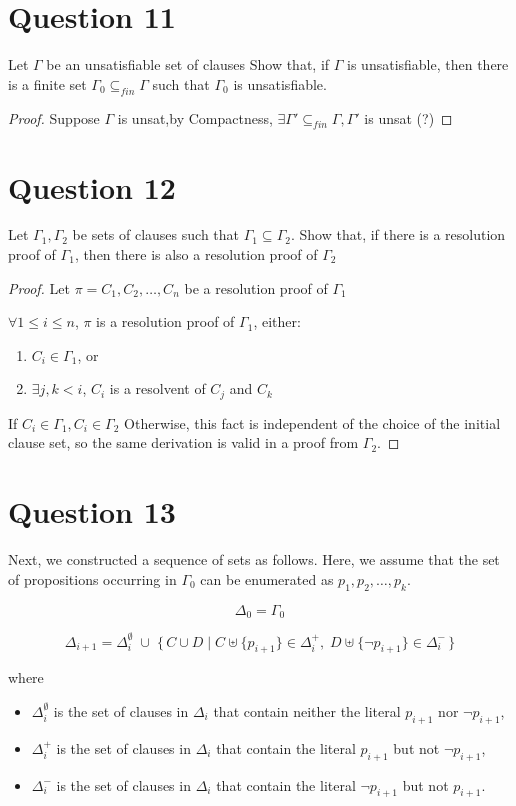 \documentclass{article}
\begin{document}
\section*{Question 11}
Let $\Gamma$ be an unsatisfiable set of clauses Show that, if $\Gamma$ is unsatisfiable, then there is a finite set $\Gamma_0 \subseteq_{fin} \Gamma$ such that $\Gamma_0$ is unsatisfiable.
\begin{proof}
    Suppose $\Gamma$ is unsat,by Compactness, $\exists \Gamma' \subseteq_{fin}\Gamma, \Gamma' $ is unsat (?)
    \end{proof}
\section*{Question 12}
Let $\Gamma_1, \Gamma_2$ be sets of clauses such that $\Gamma_1 \subseteq \Gamma_2$. Show that, if there is a resolution proof of $\Gamma_1$, then there is also a resolution proof of $\Gamma_2$
\begin{proof}
    Let $\pi = C_1, C_2, \dots, C_n$ be a resolution proof of $\Gamma_1$
    
    $\forall 1 \leq i \leq n$, $\pi$ is a resolution proof of $\Gamma_1$, either:
    \begin{enumerate}
        \item $C_i \in \Gamma_1$, or
        \item $\exists j, k < i$, $C_i$ is a resolvent of $C_j$ and $C_k$
    \end{enumerate}
    If $C_i \in \Gamma_1, C_i \in \Gamma_2$
    Otherwise, this fact is independent of the choice of the initial clause set, so the same derivation is valid in a proof from $\Gamma_2$.
    \end{proof}
\section*{Question 13}
    Next, we constructed a sequence of sets as follows. Here, we assume that the set of
    propositions occurring in $\Gamma_0$ can be enumerated as $p_1, p_2, \dots, p_k$.
    
    \[
    \Delta_0 = \Gamma_0
    \]
    
    \[
    \Delta_{i+1} =
    \Delta_i^{\emptyset}
    \;\cup\;
    \{\, C \cup D \mid
    C \uplus \{p_{i+1}\} \in \Delta_i^{+},
    \;
    D \uplus \{\neg p_{i+1}\} \in \Delta_i^{-}
    \,\}
    \]
    
    where
    
    \begin{itemize}
    \item $\Delta_i^{\emptyset}$ is the set of clauses in $\Delta_i$ that contain neither the literal $p_{i+1}$ nor $\neg p_{i+1}$,
    \item $\Delta_i^{+}$ is the set of clauses in $\Delta_i$ that contain the literal $p_{i+1}$ but not $\neg p_{i+1}$,
    \item $\Delta_i^{-}$ is the set of clauses in $\Delta_i$ that contain the literal $\neg p_{i+1}$ but not $p_{i+1}$.
    \end{itemize}
    
\end{document}
